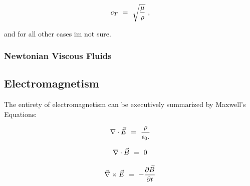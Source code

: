 \documentclass{article}
\begin{document}
\begin{equation} \label{eq:1}
c_T  \hspace{0.125cm} = \hspace{0.125cm} \sqrt{\frac{\mu}{\rho}} \hspace{0.125cm}  ,
\end{equation}

and for all other cases im not sure. 




\subsubsection{Newtonian Viscous Fluids} 





\subsection{Electromagnetism}

The entirety of electromagnetism can be executively summarized by Maxwell's Equations:

\begin{equation} \label{eq:1}
\nabla\cdot\vec{E} \hspace{0.125cm} = \hspace{0.125cm} \dfrac{\rho}{\epsilon_0.}
\end{equation}

\begin{equation} \label{eq:2}
\nabla\cdot\vec{B} \hspace{0.125cm} = \hspace{0.125cm} 0
\end{equation}

\begin{equation} \label{eq:3}
\vec{\nabla} \times \vec{E} \hspace{0.125cm} = \hspace{0.125cm} -\frac{\partial{\vec{B}}}{\partial{t}}
\end{equation}
\end{document}

